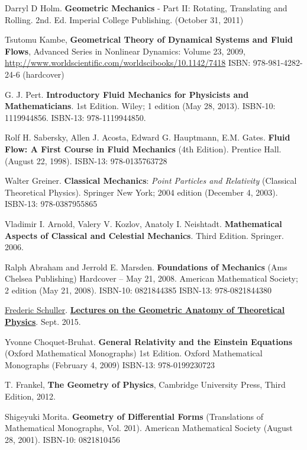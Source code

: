 \documentclass[10pt]{amsart}
\begin{document}
\begin{thebibliography}{9}
Darryl D Holm. \textbf{Geometric Mechanics} - Part II: Rotating, Translating and Rolling. 2nd. Ed. Imperial College Publishing. (October 31, 2011) 

Tsutomu Kambe, \textbf{Geometrical Theory of Dynamical Systems and Fluid Flows}, Advanced Series in Nonlinear Dynamics: Volume 23, 2009, \url{http://www.worldscientific.com/worldscibooks/10.1142/7418} ISBN: 978-981-4282-24-6 (hardcover)

G. J. Pert. \textbf{Introductory Fluid Mechanics for Physicists and Mathematicians}. 1st Edition. Wiley; 1 edition (May 28, 2013). ISBN-10: 1119944856. ISBN-13: 978-1119944850. 

Rolf H. Sabersky, Allen J. Acosta, Edward G. Hauptmann, E.M. Gates.  \textbf{Fluid Flow: A First Course in Fluid Mechanics} (4th Edition).  Prentice Hall. (August 22, 1998).  ISBN-13: 978-0135763728

Walter Greiner. \textbf{Classical Mechanics}: \emph{Point Particles and Relativity} (Classical Theoretical Physics). Springer New York; 2004 edition (December 4, 2003). ISBN-13: 978-0387955865

Vladimir I. Arnold, Valery V. Kozlov, Anatoly I. Neishtadt.  \textbf{Mathematical Aspects of Classical and Celestial Mechanics}.  Third Edition.  Springer. 2006.  

Ralph Abraham and Jerrold E. Marsden. 
\textbf{Foundations of Mechanics} (Ams Chelsea Publishing) Hardcover – May 21, 2008.  American Mathematical Society; 2 edition (May 21, 2008). ISBN-10: 0821844385
ISBN-13: 978-0821844380

\href{https://www.youtube.com/c/FredericSchuller}{Frederic Schuller}. \href{https://youtube.com/playlist?list=PLPH7f_7ZlzxTi6kS4vCmv4ZKm9u8g5yic}{\textbf{Lectures on the Geometric Anatomy of Theoretical Physics}}. Sept. 2015.

Yvonne Choquet-Bruhat.  \textbf{General Relativity and the Einstein Equations} (Oxford Mathematical Monographs) 1st Edition.  Oxford Mathematical Monographs (February 4, 2009) ISBN-13: 978-0199230723

T. Frankel,
\textbf{The Geometry of Physics}, 
Cambridge University Press, 
Third Edition,
2012.

Shigeyuki Morita. \textbf{Geometry of Differential Forms} (Translations of Mathematical Monographs, Vol. 201). American Mathematical Society (August 28, 2001). ISBN-10: 0821810456


\end{thebibliography}
\end{document}
